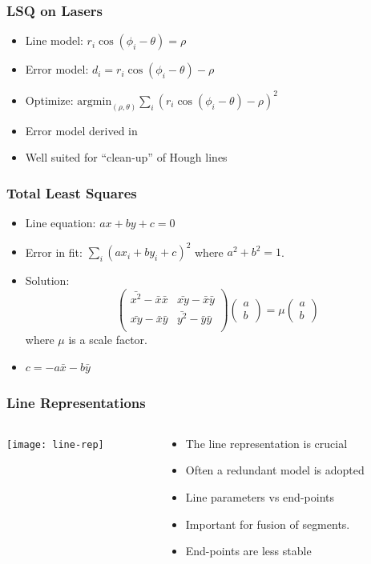 \documentclass[10pt]{beamer}
\begin{document}
\begin{frame}
  \frametitle{LSQ on Lasers}
  \begin{itemize}
  \item Line model: $r_i \cos(\phi_i - \theta) = \rho$
  \item Error model: $d_i = r_i \cos(\phi_i - \theta) - \rho$
  \item Optimize: $ \textrm{argmin}_{(\rho,\theta)} \sum_i (r_i
    \cos(\phi_i - \theta) - \rho)^2 $
  \item Error model derived in \citet{Deriche92}
  \item Well suited for ``clean-up'' of Hough lines
  \end{itemize}
\end{frame}

\begin{frame}
  \frametitle{Total Least Squares}
  \begin{itemize}
  \item Line equation: $ a x + b y + c = 0 $
  \item Error in fit: $ \sum_i (a x_i + b y_i + c)^2 $ where $a^2
    + b^2 = 1$. 
  \item Solution: \[
    \left( \begin{array}{cc}
        \bar{x^2} - \bar{x}\bar{x} & \bar{xy} - \bar{x}\bar{y} \\
        \bar{xy} - \bar{x}\bar{y}  & \bar{y^2} - \bar{y}\bar{y}\\
      \end{array} \right) 
    \left( \begin{array}{c}
        a \\ b \end{array} \right) = \mu 
    \left( \begin{array}{c}
        a \\ b \end{array} \right) \] where $\mu$ is a scale
    factor.
  \item $c = -a \bar{x} - b \bar{y}$
  \end{itemize}
\end{frame}

\begin{frame}
  \frametitle{Line Representations}
  \begin{columns}
    \begin{column}{5.5cm}
      \texttt{[image: line-rep]}
    \end{column}
    \begin{column}{6cm}
      \begin{itemize}\setlength{\itemsep}{0pt}
      \item The line representation is crucial
      \item Often a redundant model is adopted
      \item Line parameters vs end-points
      \item Important for fusion of segments.
      \item End-points are less stable 
      \end{itemize}
    \end{column}
  \end{columns}
\end{frame}
\end{document}
